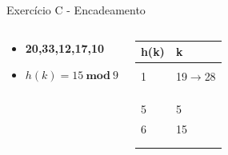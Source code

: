 \documentclass{beamer}
\begin{document}
\begin{frame}{Exercício C - Encadeamento}
\begin{columns}
        \footnotesize         
        \begin{block}{}
 		 \begin{itemize}
 		  \item \textbf{20,33,12,17,10}
 		  \item $h(k) = 15 \ \mathbf{mod} \ 9$  
 		 \end{itemize}

 		  \end{block} 
    
        \begin{table}[]
        \centering
        \footnotesize
        \begin{tabular}{|l|l|}
        \hline
        h(k) & k \\ \hline
            &   \\ \hline
        1   & 19$\rightarrow$28  \\ \hline
            &   \\ \hline
            &   \\ \hline
            &   \\ \hline
        5   & 5   \\ \hline
        6   & 15   \\ \hline
            &   \\ \hline
            &   \\ \hline
        \end{tabular}%

        \end{table}       
        \end{columns}
\end{frame}
\end{document}
